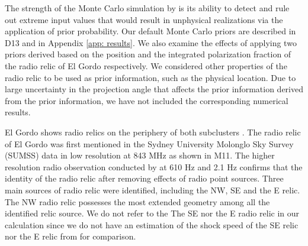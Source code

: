The strength of the Monte Carlo simulation by  is its ability
to detect and rule out extreme input values that would result in
unphysical realizations via the application of prior probability. 
Our default Monte Carlo priors are described in D13 and in Appendix
\ref{app: results}. We also examine the effects of applying 
two priors derived based on the position and the integrated polarization
fraction of the radio relic of El Gordo respectively. 
We considered other properties of the radio relic to be used as prior
information, such as the physical location. Due to large uncertainty in the
projection angle that affects the prior information derived from the prior
information, we have not included the corresponding numerical results.
\par 
El Gordo shows radio relics on the periphery of both subclusters
. The
radio relic  of El Gordo was first mentioned in the Sydney University
Molonglo Sky Survey (SUMSS) data in low resolution at 843 MHz
\citep{Mauch03} as shown in M11. The higher resolution radio observation
conducted by \cite{L13} at 610 \mega Hz and 2.1 \giga Hz confirms that the identity of the radio relic
after removing effects of radio point sources. 
Three main sources of radio relic were identified, including the NW, SE and the
E relic. The NW radio relic possesses the most extended geometry among all
the identified relic source. We do not refer to the The SE nor the E radio
relic in our calculation since we do not have an estimation of the shock
speed of the SE relic nor the E relic from \citet{L13} for comparison.    


